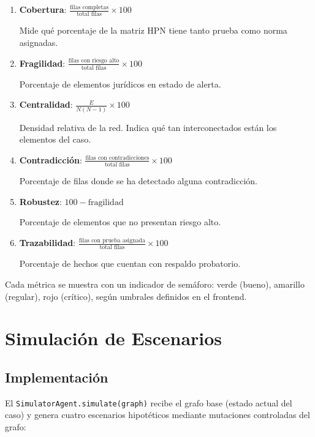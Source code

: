 \documentclass[12pt, letterpaper]{article}
\begin{document}
\begin{enumerate}[nosep]
  \item \textbf{Cobertura}: $\frac{\text{filas completas}}{\text{total filas}} \times 100$

    Mide qué porcentaje de la matriz HPN tiene tanto prueba como
    norma asignadas.

  \item \textbf{Fragilidad}: $\frac{\text{filas con riesgo alto}}{\text{total filas}} \times 100$

    Porcentaje de elementos jurídicos en estado de alerta.

  \item \textbf{Centralidad}: $\frac{E}{N(N-1)} \times 100$

    Densidad relativa de la red. Indica qué tan interconectados
    están los elementos del caso.

  \item \textbf{Contradicción}: $\frac{\text{filas con contradicciones}}{\text{total filas}} \times 100$

    Porcentaje de filas donde se ha detectado alguna contradicción.

  \item \textbf{Robustez}: $100 - \text{fragilidad}$

    Porcentaje de elementos que no presentan riesgo alto.

  \item \textbf{Trazabilidad}: $\frac{\text{filas con prueba asignada}}{\text{total filas}} \times 100$

    Porcentaje de hechos que cuentan con respaldo probatorio.
\end{enumerate}

\noindent Cada métrica se muestra con un indicador de semáforo:
verde (bueno), amarillo (regular), rojo (crítico), según umbrales
definidos en el frontend.

\newpage
\section{Simulación de Escenarios}

\subsection{Implementación}

El \texttt{SimulatorAgent.simulate(graph)} recibe el grafo base
(estado actual del caso) y genera cuatro escenarios hipotéticos
mediante mutaciones controladas del grafo:
\end{document}
